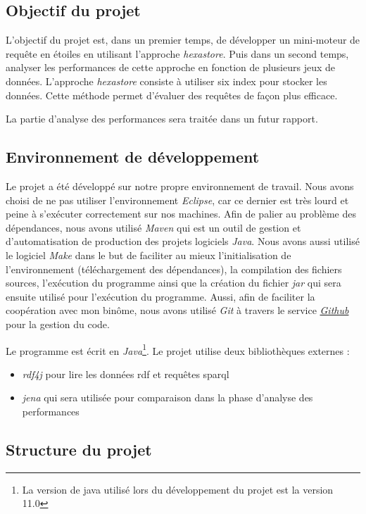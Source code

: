 \documentclass[12pt,titlepage]{article}
\begin{document}
\subsection*{Objectif du projet}

L'objectif du projet est, dans un premier temps, de développer un mini-moteur de requête en étoiles en utilisant l'approche \textit{hexastore}. Puis dans un second temps, analyser les performances de cette approche en fonction de plusieurs jeux de données. L'approche \textit{hexastore} consiste à utiliser six index pour stocker les données. Cette méthode permet d'évaluer des requêtes de façon plus efficace.

La partie d'analyse des performances sera traitée dans un futur rapport.

\subsection*{Environnement de développement}

Le projet a été développé sur notre propre environnement de travail. Nous avons choisi de ne pas utiliser l'environnement \textit{Eclipse}, car ce dernier est très lourd et peine à s'exécuter correctement sur nos machines. Afin de palier au problème des dépendances, nous avons utilisé \textit{Maven} qui est un outil de gestion et d'automatisation de production des projets logiciels \textit{Java}. Nous avons aussi utilisé le logiciel \textit{Make} dans le but de faciliter au mieux l'initialisation de l'environnement (téléchargement des dépendances), la compilation des fichiers sources, l'exécution du programme ainsi que la création du fichier \textit{jar} qui sera ensuite utilisé pour l'exécution du programme. Aussi, afin de faciliter la coopération avec mon binôme, nous avons utilisé \textit{Git} à travers le service \href{https://github.com/chakibreds/mtq_moteur_sparql}{\textit{Github}} pour la gestion du code. 

Le programme est écrit en \textit{Java}\footnote{La version de java utilisé lors du développement du projet est la version 11.0}. Le projet utilise deux bibliothèques externes :
\begin{itemize}
	\item \textit{rdf4j} pour lire les données rdf et requêtes sparql
	\item \textit{jena} qui sera utilisée pour comparaison dans la phase d’analyse des performances
\end{itemize}

\subsection*{Structure du projet}
\end{document}
